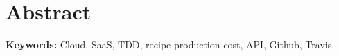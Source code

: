\documentclass[a4paper,openright,14pt]{book}
\begin{document}
\chapter*{Abstract}

\emph{}

\vspace*{0.2in}
\textbf{Keywords:} Cloud, SaaS, TDD, recipe production cost, API, Github, Travis.
\end{document}
